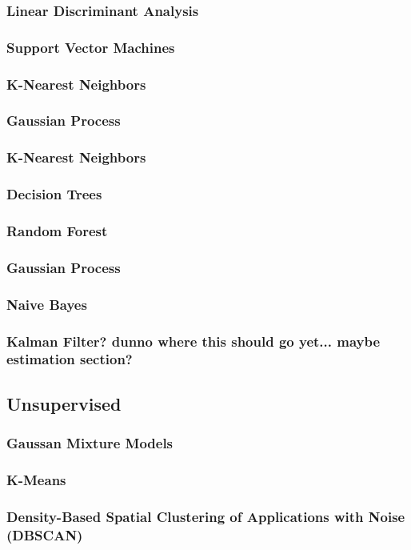\documentclass[11pt]{article}
\begin{document}
\subsubsection{Linear Discriminant Analysis}
\subsubsection{Support Vector Machines}
\subsubsection{K-Nearest Neighbors}
\subsubsection{Gaussian Process}
\subsubsection{K-Nearest Neighbors}
\subsubsection{Decision Trees}
\subsubsection{Random Forest}
\subsubsection{Gaussian Process}
\subsubsection{Naive Bayes}
\subsubsection{Kalman Filter? dunno where this should go yet... maybe estimation section?}
\subsection{Unsupervised}
\subsubsection{Gaussan Mixture Models}
\subsubsection{K-Means}
\subsubsection{Density-Based Spatial Clustering of Applications with Noise (DBSCAN)}
\end{document}
